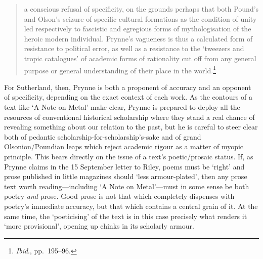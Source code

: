 \documentclass[]{article}
\begin{document}
\begin{quote}
\singlespacing a conscious refusal of specificity, on the grounds
perhaps that both Pound’s and Olson’s seizure of specific cultural
formations as the condition of unity led respectively to fascistic and
egregious forms of mythologisation of the heroic modern individual.
Prynne’s vagueness is thus a calculated form of resistance to political
error, as well as a resistance to the ‘tweezers and tropic catalogues’
of academic forms of rationality cut off from any general purpose or
general understanding of their place in the world.\footnote{\emph{Ibid}.,
  pp.~195–96.}
\end{quote}

\noindent For Sutherland, then, Prynne is both a proponent of accuracy
and an opponent of specificity, depending on the exact context of each
work. As the contours of a text like ‘A Note on Metal’ make clear,
Prynne is prepared to deploy all the resources of conventional
historical scholarship where they stand a real chance of revealing
something about our relation to the past, but he is careful to steer
clear both of pedantic scholarship-for-scholarship’s-sake and of grand
Olsonion/Poundian leaps which reject academic rigour as a matter of
myopic principle. This bears directly on the issue of a text’s
poetic/prosaic status. If, as Prynne claims in the 15 September letter
to Riley, poems must be ‘right’ and prose published in little magazines
should ‘less armour-plated’, then any prose text worth reading—including
‘A Note on Metal’—must in some sense be both poetry \emph{and} prose.
Good prose is not that which completely dispenses with poetry’s
immediate accuracy, but that which contains a central grain of it. At
the same time, the ‘poeticising’ of the text is in this case precisely
what renders it ‘more provisional’, opening up chinks in its scholarly
armour.
\end{document}
